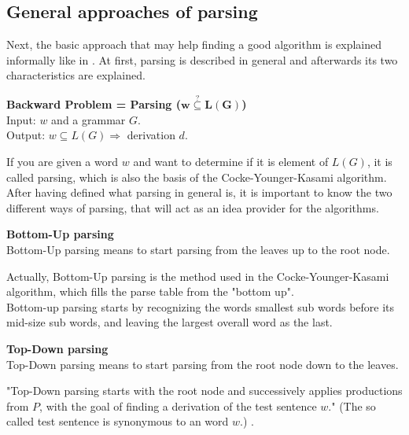 \subsection{General approaches of parsing} \label{approaches}
Next, the basic approach that may help finding a good algorithm is explained informally like in \cite{Duda.2012}. At first, parsing is described in general and afterwards its two characteristics are explained.  
\begin{DefGrey}
	\textbf{Backward Problem = Parsing ($\mathbf{w\overset{?}{\subseteq}L(G)}$)}\\
	Input: $w$ and a grammar $G$. \\
	Output: $w \subseteq L(G) \Longrightarrow$ derivation $d$.
\end{DefGrey}
\noindent If you are given a word $w$ and want to determine if it is element of $L(G)$, it is called parsing, which is also the basis of the Cocke-Younger-Kasami algorithm.\\
After having defined what parsing in general is, it is important to know the two different ways of parsing, that will act as an idea provider for the algorithms.
\begin{mdframed}[backgroundcolor=defColour]
	\textbf{Bottom-Up parsing} \\
Bottom-Up parsing means to start parsing from the leaves up to the root node.
\end{mdframed}
\noindent Actually, Bottom-Up parsing is the method used in the Cocke-Younger-Kasami algorithm, which fills the parse table from the "bottom up"\cite{Duda.2012}.\\
Bottom-up parsing starts by recognizing the words smallest sub words before its mid-size sub words, and leaving the largest overall word as the last.
\begin{mdframed}[backgroundcolor=defColour]
	\textbf{Top-Down parsing} \\
	 Top-Down parsing means to start parsing from the root node down to the leaves.
\end{mdframed}
\noindent "Top-Down parsing starts with the root node and successively applies productions from $P$, with the goal of finding a derivation of the test sentence $w$." \cite{Duda.2012} (The so called test sentence is synonymous to an word $w$.) \cite{Duda.2012}.


